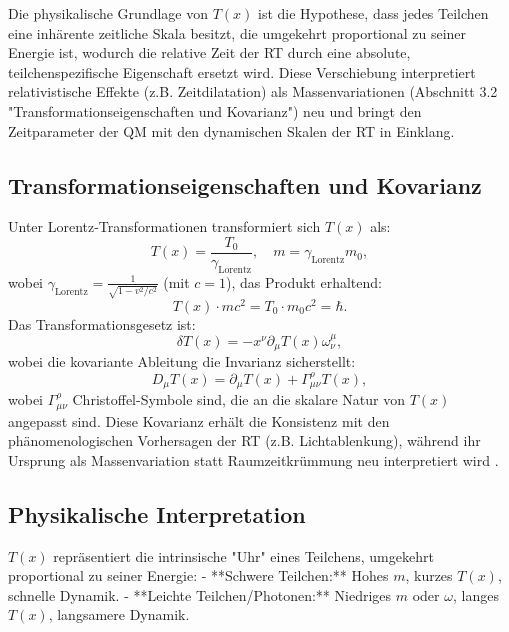 \documentclass[12pt,a4paper]{article}
\newcommand{\Tfield}{T(x)}
\newcommand{\Tzero}{T_0}
\newcommand{\gammaf}{\gamma_{\text{Lorentz}}}
\begin{document}
	Die physikalische Grundlage von \(\Tfield\) ist die Hypothese, dass jedes Teilchen eine inhärente zeitliche Skala besitzt, die umgekehrt proportional zu seiner Energie ist, wodurch die relative Zeit der RT durch eine absolute, teilchenspezifische Eigenschaft ersetzt wird. Diese Verschiebung interpretiert relativistische Effekte (z.B. Zeitdilatation) als Massenvariationen (Abschnitt 3.2 "Transformationseigenschaften und Kovarianz") neu und bringt den Zeitparameter der QM mit den dynamischen Skalen der RT in Einklang.
	
	\subsection{Transformationseigenschaften und Kovarianz}
	\label{subsec:transformations}
	
	Unter Lorentz-Transformationen transformiert sich \(\Tfield\) als:
	\begin{equation}
		\Tfield = \frac{\Tzero}{\gammaf}, \quad m = \gammaf m_0,
		\label{eq:transform}
	\end{equation}
	wobei \(\gammaf = \frac{1}{\sqrt{1 - v^2/c^2}}\) (mit \(c = 1\)), das Produkt erhaltend:
	\begin{equation}
		\Tfield \cdot m c^2 = \Tzero \cdot m_0 c^2 = \hbar.
		\label{eq:invariant_product}
	\end{equation}
	Das Transformationsgesetz ist:
	\begin{equation}
		\delta\Tfield = -x^{\nu}\partial_{\mu}\Tfield\omega_{\nu}^{\mu},
		\label{eq:lorentz_transform}
	\end{equation}
	wobei die kovariante Ableitung die Invarianz sicherstellt:
	\begin{equation}
		D_{\mu}\Tfield = \partial_{\mu}\Tfield + \Gamma_{\mu\nu}^{\rho}\Tfield,
		\label{eq:covariant_derivative}
	\end{equation}
	wobei \(\Gamma_{\mu\nu}^{\rho}\) Christoffel-Symbole sind, die an die skalare Natur von \(\Tfield\) angepasst sind. Diese Kovarianz erhält die Konsistenz mit den phänomenologischen Vorhersagen der RT (z.B. Lichtablenkung), während ihr Ursprung als Massenvariation statt Raumzeitkrümmung neu interpretiert wird \cite{pascher_lagrange_2025}.
	
	\subsection{Physikalische Interpretation}
	\label{subsec:time_interpretation}
	
	\(\Tfield\) repräsentiert die intrinsische "Uhr" eines Teilchens, umgekehrt proportional zu seiner Energie:
	- **Schwere Teilchen:** Hohes \(m\), kurzes \(\Tfield\), schnelle Dynamik.
	- **Leichte Teilchen/Photonen:** Niedriges \(m\) oder \(\omega\), langes \(\Tfield\), langsamere Dynamik.
	
\end{document}
